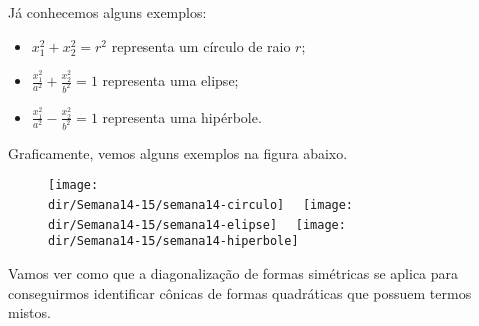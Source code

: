 \documentclass[../livro.tex]{subfiles}
\providecommand{\dir}{..}  %
\begin{document}
Já conhecemos alguns exemplos:
\begin{itemize}
	\item $x_1^2 + x_2^2 = r^2$ representa um círculo de raio $r$;
	\item $\frac{x_1^2}{a^2} + \frac{x_2^2}{b^2} = 1$ representa uma elipse;
	\item $\frac{x_1^2}{a^2} - \frac{x_2^2}{b^2} = 1$ representa uma hipérbole.
\end{itemize} Graficamente, vemos alguns exemplos na figura abaixo.
\begin{figure}[h!]
	\begin{center}
		\texttt{[image: \\dir/Semana14-15/semana14-circulo]} \ \ \texttt{[image: \\dir/Semana14-15/semana14-elipse]} \ \ \texttt{[image: \\dir/Semana14-15/semana14-hiperbole]}
	\end{center}
\end{figure}

\noindent Vamos ver como que a diagonalização de formas simétricas se aplica para conseguirmos identificar cônicas de formas quadráticas que possuem termos mistos.
\end{document}
